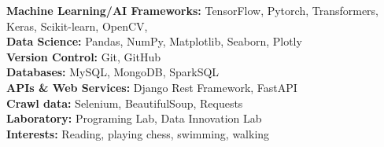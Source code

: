 \documentclass[11pt]{article}
\begin{document}
    \textbf{Machine Learning/AI Frameworks:} TensorFlow, Pytorch, Transformers, Keras, Scikit-learn, OpenCV,  \\
    \textbf{Data Science:} Pandas, NumPy, Matplotlib, Seaborn, Plotly\\
    \textbf{Version Control:} Git, GitHub\\
    \textbf{Databases:} MySQL, MongoDB, SparkSQL\\
    \textbf{APIs \& Web Services:} Django Rest Framework, FastAPI\\
    \textbf{Crawl data:} Selenium, BeautifulSoup, Requests\\
    \textbf{Laboratory:} Programing Lab, Data Innovation Lab \\
    \textbf{Interests:} Reading, playing chess, swimming, walking \\

\end{document}
